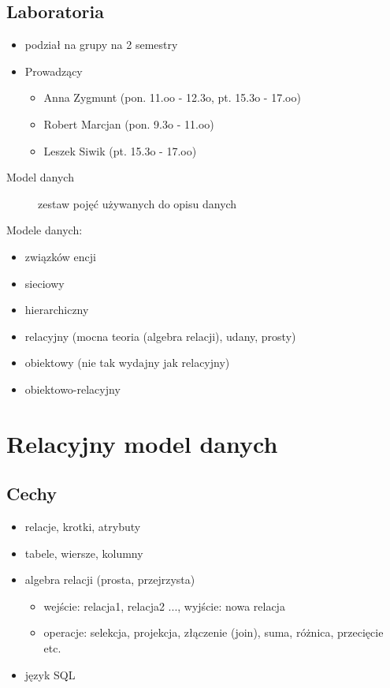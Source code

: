 \documentclass[12pt]{article}
\begin{document}
\subsection{Laboratoria}
\begin{itemize}
\item podział na grupy na 2 semestry
\item Prowadzący
\begin{itemize}
\item Anna Zygmunt (pon. 11.oo - 12.3o, pt. 15.3o - 17.oo)
\item Robert Marcjan (pon. 9.3o - 11.oo)
\item Leszek Siwik (pt. 15.3o - 17.oo)
\end{itemize}
\end{itemize}


\begin{description}
\item[Model danych] zestaw pojęć używanych do opisu danych
\end{description}

Modele danych:
\begin{itemize}
\item związków encji
\item sieciowy
\item hierarchiczny
\item relacyjny (mocna teoria (algebra relacji), udany, prosty)
\item obiektowy (nie tak wydajny jak relacyjny)
\item obiektowo-relacyjny
\end{itemize}

\section{Relacyjny model danych}
\subsection{Cechy}

\begin{itemize}
\item relacje, krotki, atrybuty
\item tabele, wiersze, kolumny
\item algebra relacji (prosta, przejrzysta)
\begin{itemize}
\item wejście: relacja1, relacja2 ..., wyjście: nowa relacja
\item operacje: selekcja, projekcja, złączenie (join), suma, różnica, przecięcie etc.
\end{itemize}
\item język \acs{SQL}
\end{itemize}
\end{document}
